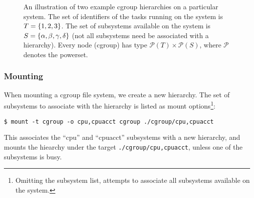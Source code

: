\begin{figure}[h!]

\centering


\caption[]{An illustration of two example cgroup hierarchies on a particular
system. The set of identifiers of the tasks running on the system is
$T=\left\{{1,2,3}\right\}$. The set of subsystems available on the system is
$S=\left\{{\alpha,\beta,\gamma,\delta}\right\}$ (not all subsystems need be associated
with a hierarchy). Every node (cgroup) has type
$\mathcal{P}(T)\times\mathcal{P}(S)$, where $\mathcal{P}$ denotes the
powerset.}

\label{figure:hierarchy-example}

\end{figure}

\subsubsection{Mounting}

When mounting a cgroup file system, we create a new hierarchy. The set of
subsystems to associate with the hierarchy is listed as mount
options\footnote{Omitting the subsystem list, attempts to associate all
subsystems available on the system.}:

\begin{lstlisting}
$ mount -t cgroup -o cpu,cpuacct cgroup ./cgroup/cpu,cpuacct
\end{lstlisting}

This associates the ``cpu'' and ``cpuacct'' subsystems with a new hierarchy,
and mounts the hiearchy under the target \texttt{./cgroup/cpu,cpuacct}, unless
one of the subsystems is busy.


